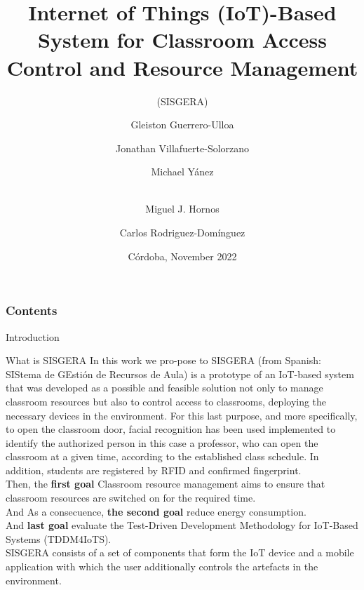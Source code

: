 \documentclass[notes=show, 10pt]{beamer}
\title[UCAmI 2022]{Internet of Things (IoT)-Based System for Classroom Access Control and Resource Management}
\subtitle{(SISGERA)}
\author[Gleiston Guerrero-Ulloa]{Gleiston Guerrero-Ulloa \and Jonathan Villafuerte-Solorzano \and Michael Yánez  \and \\ Miguel J. Hornos \and Carlos Rodriguez-Domínguez}
\institute[gguerrero@uteq.edu.ec]{Technical State University of Quevedo, and University of Granada}
\date[Córdoba, November 2022]{Córdoba, November 2022}
\begin{document}
\frame{\titlepage}
\begin{frame}
\frametitle{Contents}
\tableofcontents
\end{frame}

    \begin{frame}{Introduction}
        \begin{block}{What is SISGERA}
            In this work we pro-pose to SISGERA (from Spanish: SIStema de GEstión de Recursos de Aula) is a prototype of an IoT-based system that was developed as a possible and feasible solution not only to manage classroom resources but also to control access to classrooms, deploying the necessary devices in the environment. For this last purpose, and more specifically, to open the classroom door, facial recognition has been used implemented to identify the authorized person in this case a professor, who can open the classroom at a given time, according to the established class schedule. In addition, students are registered by RFID and confirmed fingerprint.\\
            Then, the \textbf{first goal} Classroom resource management aims to ensure that classroom resources are switched on for the required time.\\
            And As a consecuence, \textbf{the second goal} reduce energy consumption.\\
            And \textbf{last goal} evaluate the Test-Driven Development Methodology for IoT-Based Systems (TDDM4IoTS).\\
            SISGERA consists of a set of components that form the IoT device and a mobile application with which the user additionally controls the artefacts in the environment.
        \end{block}
    \end{frame}
\end{document}
